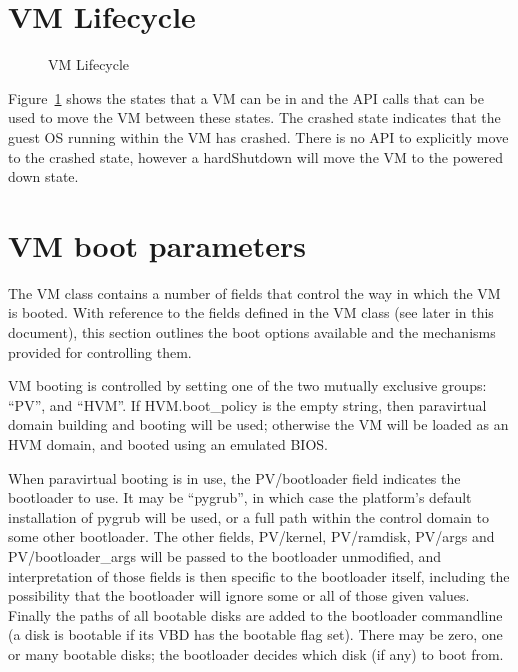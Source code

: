 %
%
%
%

\section{VM Lifecycle}

\begin{figure}
\centering
{}
\caption{VM Lifecycle}
\label{fig-vm-lifecycle}
\end{figure}

Figure~\ref{fig-vm-lifecycle} shows the states that a VM can be in
and the API calls that can be used to move the VM between these states.  The crashed
state indicates that the guest OS running within the VM has crashed.  There is no
API to explicitly move to the crashed state, however a hardShutdown will move the
VM to the powered down state.

\section{VM boot parameters}

The VM class contains a number of fields that control the way in which the VM is booted.
With reference to the fields defined in the VM class (see later in this document),
this section outlines the boot options available and the mechanisms provided for controlling them.

VM booting is controlled by setting one of the two mutually exclusive groups: ``PV'', and ``HVM''.  If HVM.boot\_policy is the empty string, then paravirtual domain building and booting will be used; otherwise the VM will be loaded as an HVM domain, and booted using an emulated BIOS.

When paravirtual booting is in use, the PV/bootloader field indicates the bootloader to use.  It may be ``pygrub'', in which case the platform's default installation of pygrub will be used, or a full path within the control domain to some other bootloader.  The other fields, PV/kernel, PV/ramdisk, PV/args and PV/bootloader\_args will be passed to the bootloader unmodified, and interpretation of those fields is then specific to the bootloader itself, including the possibility that the bootloader will ignore some or all of those given values. Finally the paths of all bootable disks are added to the bootloader commandline (a disk is bootable if its VBD has the bootable flag set). There may be zero, one or many bootable disks; the bootloader decides which disk (if any) to boot from.

